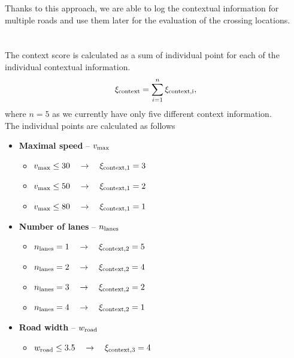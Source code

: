             Thanks to this approach, we are able to log the contextual information for multiple roads and use them later for the evaluation of the crossing locations.\\\\
        \\
            The context score is calculated as a sum of individual point for each of the individual contextual information.
            \begin{equation}
                \xi_{\rm{context}} = \sum_{i=1}^{n} \xi_{\rm{context},i},
            \end{equation}
            where $n=5$ as we currently have only five different context information.\\
            The individual points are calculated as follows
            \begin{itemize}
                \item \textbf{Maximal speed} -- $v_{\rm{max}}$
                    \begin{itemize}
                        \item $v_{\rm{max}}\leq30\quad\to\quad\xi_{\rm{context,1}}=3$
                        \item $v_{\rm{max}}\leq50\quad\to\quad\xi_{\rm{context,1}}=2$
                        \item $v_{\rm{max}}\leq80\quad\to\quad\xi_{\rm{context,1}}=1$
                    \end{itemize}
                \item \textbf{Number of lanes} -- $n_{\rm{lanes}}$
                    \begin{itemize}
                        \item $n_{\rm{lanes}}=1\quad\to\quad\xi_{\rm{context,2}}=5$
                        \item $n_{\rm{lanes}}=2\quad\to\quad\xi_{\rm{context,2}}=4$
                        \item $n_{\rm{lanes}}=3\quad\to\quad\xi_{\rm{context,2}}=2$
                        \item $n_{\rm{lanes}}=4\quad\to\quad\xi_{\rm{context,2}}=1$
                    \end{itemize}
                \item \textbf{Road width} -- $w_{\rm{road}}$
                    \begin{itemize}
                        \item $w_{\rm{road}}\leq3.5\quad\to\quad\xi_{\rm{context,3}}=4$

\end{itemize}
\end{itemize}

